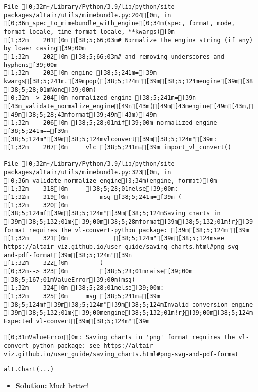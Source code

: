 \documentclass[
  letterpaper,
  DIV=11,
  numbers=noendperiod]{scrartcl}
\providecommand{\tightlist}{%
  \setlength{\itemsep}{0pt}\setlength{\parskip}{0pt}}\usepackage{longtable,booktabs,array}
\begin{document}
\begin{verbatim}
File [0;32m~/Library/Python/3.9/lib/python/site-packages/altair/utils/mimebundle.py:204[0m, in [0;36m_spec_to_mimebundle_with_engine[0;34m(spec, format, mode, format_locale, time_format_locale, **kwargs)[0m
[1;32m    201[0m [38;5;66;03m# Normalize the engine string (if any) by lower casing[39;00m
[1;32m    202[0m [38;5;66;03m# and removing underscores and hyphens[39;00m
[1;32m    203[0m engine [38;5;241m=[39m kwargs[38;5;241m.[39mpop([38;5;124m"[39m[38;5;124mengine[39m[38;5;124m"[39m, [38;5;28;01mNone[39;00m)
[0;32m--> 204[0m normalized_engine [38;5;241m=[39m [43m_validate_normalize_engine[49m[43m([49m[43mengine[49m[43m,[49m[43m [49m[38;5;28;43mformat[39;49m[43m)[49m
[1;32m    206[0m [38;5;28;01mif[39;00m normalized_engine [38;5;241m==[39m [38;5;124m"[39m[38;5;124mvlconvert[39m[38;5;124m"[39m:
[1;32m    207[0m     vlc [38;5;241m=[39m import_vl_convert()

File [0;32m~/Library/Python/3.9/lib/python/site-packages/altair/utils/mimebundle.py:323[0m, in [0;36m_validate_normalize_engine[0;34m(engine, format)[0m
[1;32m    318[0m     [38;5;28;01melse[39;00m:
[1;32m    319[0m         msg [38;5;241m=[39m (
[1;32m    320[0m             [38;5;124mf[39m[38;5;124m"[39m[38;5;124mSaving charts in [39m[38;5;132;01m{[39;00m[38;5;28mformat[39m[38;5;132;01m!r}[39;00m[38;5;124m format requires the vl-convert-python package: [39m[38;5;124m"[39m
[1;32m    321[0m             [38;5;124m"[39m[38;5;124msee https://altair-viz.github.io/user_guide/saving_charts.html#png-svg-and-pdf-format[39m[38;5;124m"[39m
[1;32m    322[0m         )
[0;32m--> 323[0m         [38;5;28;01mraise[39;00m [38;5;167;01mValueError[39;00m(msg)
[1;32m    324[0m [38;5;28;01melse[39;00m:
[1;32m    325[0m     msg [38;5;241m=[39m [38;5;124mf[39m[38;5;124m"[39m[38;5;124mInvalid conversion engine [39m[38;5;132;01m{[39;00mengine[38;5;132;01m!r}[39;00m[38;5;124m. Expected vl-convert[39m[38;5;124m"[39m

[0;31mValueError[0m: Saving charts in 'png' format requires the vl-convert-python package: see https://altair-viz.github.io/user_guide/saving_charts.html#png-svg-and-pdf-format
\end{verbatim}

\begin{verbatim}
alt.Chart(...)
\end{verbatim}

\begin{itemize}
\tightlist
\item
  \textbf{Solution:} Much better!
\end{itemize}
\end{document}
